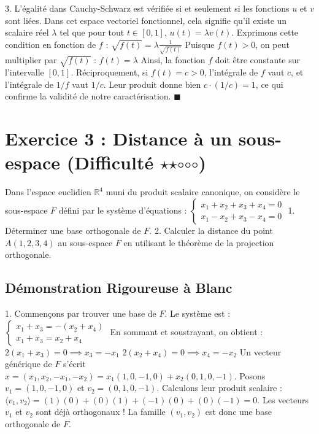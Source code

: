 \documentclass{report}
\begin{document}
3. L'égalité dans Cauchy-Schwarz est vérifiée si et seulement si les fonctions $u$ et $v$ sont liées. Dans cet espace vectoriel fonctionnel, cela signifie qu'il existe un scalaire réel $\lambda$ tel que pour tout $t \in [0, 1]$, $u(t) = \lambda v(t)$.
   Exprimons cette condition en fonction de $f$ :
   $ \sqrt{f(t)} = \lambda \frac{1}{\sqrt{f(t)}} $
   Puisque $f(t) > 0$, on peut multiplier par $\sqrt{f(t)}$ :
   $ f(t) = \lambda $
   Ainsi, la fonction $f$ doit être constante sur l'intervalle $[0, 1]$. Réciproquement, si $f(t) = c > 0$, l'intégrale de $f$ vaut $c$, et l'intégrale de $1/f$ vaut $1/c$. Leur produit donne bien $c \cdot (1/c) = 1$, ce qui confirme la validité de notre caractérisation.
   $\blacksquare$

\newpage


\chapter*{Exercice 3 : Distance à un sous-espace (Difficulté $\star$$\star$$\circ$$\circ$$\circ$)}

Dans l'espace euclidien $\mathbb{R}^4$ muni du produit scalaire canonique, on considère le sous-espace $F$ défini par le système d'équations :
$ \begin{cases} x_1 + x_2 + x_3 + x_4 = 0 \\ x_1 - x_2 + x_3 - x_4 = 0 \end{cases} $
1. Déterminer une base orthogonale de $F$.
2. Calculer la distance du point $A(1, 2, 3, 4)$ au sous-espace $F$ en utilisant le théorème de la projection orthogonale.

\section*{Démonstration Rigoureuse à Blanc}

1. Commençons par trouver une base de $F$. Le système est :
   $ \begin{cases} x_1 + x_3 = -(x_2 + x_4) \\ x_1 + x_3 = x_2 + x_4 \end{cases} $
   En sommant et soustrayant, on obtient :
   $ 2(x_1 + x_3) = 0 \implies x_3 = -x_1 $
   $ 2(x_2 + x_4) = 0 \implies x_4 = -x_2 $
   Un vecteur générique de $F$ s'écrit $x = (x_1, x_2, -x_1, -x_2) = x_1(1, 0, -1, 0) + x_2(0, 1, 0, -1)$.
   Posons $v_1 = (1, 0, -1, 0)$ et $v_2 = (0, 1, 0, -1)$.
   Calculons leur produit scalaire : $\langle v_1, v_2 \rangle = (1)(0) + (0)(1) + (-1)(0) + (0)(-1) = 0$.
   Les vecteurs $v_1$ et $v_2$ sont déjà orthogonaux ! La famille $(v_1, v_2)$ est donc une base orthogonale de $F$.
\end{document}
